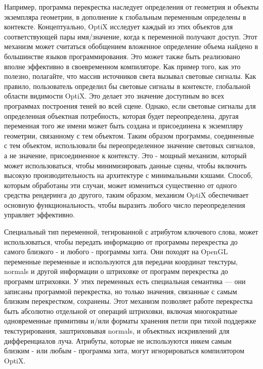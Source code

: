   Например, программа перекрестка наследует определения от геометрия и объекты экземпляра геометрии, в дополнение к глобальным переменным определены в контексте. Концептуально, OptiX исследует каждый из этих объектов для соответствующей пары имя/значение, когда к переменной получают доступ. Этот механизм может считаться обобщением вложенное определение объема найдено в большинстве языков программирования. Это может также быть реализовано вполне эффективно в своевременном компиляторе. Как пример того, как это полезно, полагайте, что массив источников света вызывал световые сигналы. Как правило, пользователь определил бы световые сигналы в контексте, глобальной области видимости OptiX. Это делает это значение доступным во всех программах построения теней во всей сцене. Однако, если световые сигналы для определенная объектная потребность, которая будет переопределена, другая переменная того же имени может быть создана и присоединена к экземпляру геометрии, связанному с тем объектом. Таким образом программы, соединенные с тем объектом, использовали бы переопределенное значение световых сигналов, а не значение, присоединенное к контексту. Это - мощный механизм, который может использоваться, чтобы минимизировать данные сцены, чтобы включить высокую производительность на архитектуре с минимальными кэшами. Способ, которым обработаны эти случаи, может измениться существенно от одного средства рендеринга до другого, таким образом, механизм OptiX обеспечивает основную функциональность, чтобы выразить любого число переопределения управляет эффективно.

Специальный тип переменной, тегированной с атрибутом ключевого слова, может использоваться, чтобы передать информацию от программы перекрестка до самого близкого - и любого - программы хита. Они походят на OpenGL переменные переменные и используются для передачи координат текстуры, normals и другой информации о штриховке от программ перекрестка до программ штриховки. У этих переменных есть специальная семантика — они записаны программой перекрестка, но только значения, связанные с самым близким перекрестком, сохранены. Этот механизм позволяет работе перекрестка быть абсолютно отдельной от операций штриховки, включая многократные одновременные примитивы и/или форматы хранения петли при тихой поддержке текстурирования, заштриховывая normals, и объектных искривлений для дифференциалов луча. Атрибуты, которые не используются никем самым близким - или любым - программа хита, могут игнорироваться компилятором OptiX.
